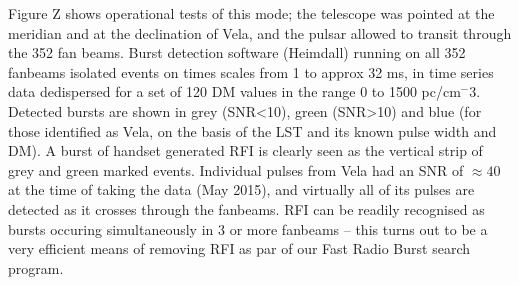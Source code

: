 Figure Z shows operational tests of this mode; the telescope was pointed at the meridian and at the declination of Vela, and the pulsar allowed to transit through the 352 fan beams. Burst detection software (Heimdall) running on all 352 fanbeams isolated events on times scales from 1 to approx 32 ms, in time series data dedispersed for a set of 120 DM values in the range 0 to 1500 pc/cm$^-3$. Detected bursts are shown in grey (SNR<10), green (SNR>10) and blue (for those identified as Vela, on the basis of the LST and its known pulse width and DM). A burst of handset generated RFI is clearly seen as the vertical strip of grey and green marked events. Individual pulses from Vela had an SNR of $\approx 40$ at the time of taking the data (May 2015), and virtually all of its pulses are detected as it crosses through the fanbeams. RFI can be readily recognised as bursts occuring simultaneously in 3 or more fanbeams -- this turns out to be a very efficient means of removing RFI as par of our Fast Radio Burst search program.    

  
  